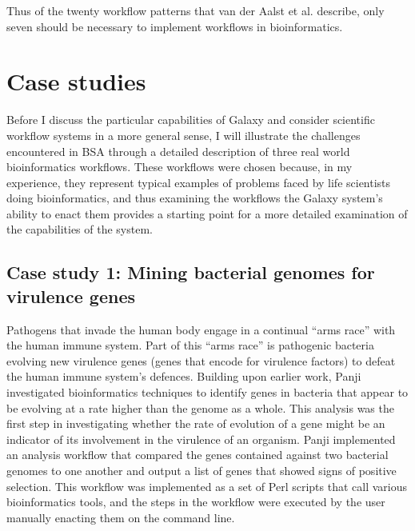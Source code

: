 \documentclass[a4paper,10pt]{scrreprt} \usepackage[utf8]{inputenc}
\begin{document}
Thus of the twenty workflow patterns that van der Aalst et al. describe, only seven should be necessary to implement workflows in bioinformatics.


\section{Case studies}

Before I discuss the particular capabilities of Galaxy and consider scientific workflow systems in a more general sense, I will illustrate the challenges encountered in \gls{BSA} through a detailed description of three real world bioinformatics workflows. These workflows were chosen because, in my experience, they represent typical examples of problems faced by life scientists doing bioinformatics, and thus examining the workflows the Galaxy system's ability to enact them provides a starting point for a more detailed examination of the capabilities of the system.

\subsection{Case study 1: Mining bacterial genomes for virulence genes}

Pathogens that invade the human body engage in a continual ``arms race'' with the human immune system. Part of this ``arms race'' is pathogenic bacteria evolving new virulence genes (genes that encode for virulence factors) to defeat the human immune system's defences. Building upon earlier work, Panji \cite{panji_identification_2009} investigated bioinformatics techniques to identify genes in bacteria that appear to be evolving at a rate higher than the genome as a whole. This analysis was the first step in investigating whether the rate of evolution of a gene might be an indicator of its involvement in the virulence of an organism. Panji implemented an analysis workflow that compared the genes contained against two bacterial genomes to one another and output a list of genes that showed signs of positive selection. This workflow was implemented as a set of Perl scripts that call various bioinformatics tools, and the steps in the workflow were executed by the user manually enacting them on the command line.
\end{document}
